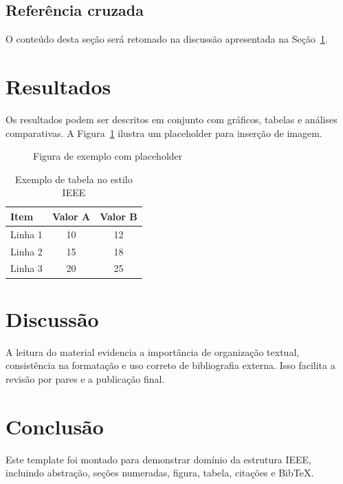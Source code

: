 \subsection{Referência cruzada}
O conteúdo desta seção será retomado na discussão apresentada na Seção~\ref{sec:resultados}.

\section{Resultados}
\label{sec:resultados}
Os resultados podem ser descritos em conjunto com gráficos, tabelas e análises comparativas. A Figura~\ref{fig:placeholder} ilustra um placeholder para inserção de imagem.

\begin{figure}[!t]
    \centering
    \fbox{\rule{0pt}{4cm}\rule{0.95\linewidth}{0pt}}
    \caption{Figura de exemplo com placeholder}
    \label{fig:placeholder}
\end{figure}

\begin{table}[!t]
\centering
\caption{Exemplo de tabela no estilo IEEE}
\label{tab:exemplo}
\begin{tabular}{lcc}
\toprule
Item & Valor A & Valor B \\
\midrule
Linha 1 & 10 & 12 \\
Linha 2 & 15 & 18 \\
Linha 3 & 20 & 25 \\
\bottomrule
\end{tabular}
\end{table}

\section{Discussão}
A leitura do material evidencia a importância de organização textual, consistência na formatação e uso correto de bibliografia externa. Isso facilita a revisão por pares e a publicação final.

\section{Conclusão}
Este template foi montado para demonstrar domínio da estrutura IEEE, incluindo abstração, seções numeradas, figura, tabela, citações e BibTeX.




